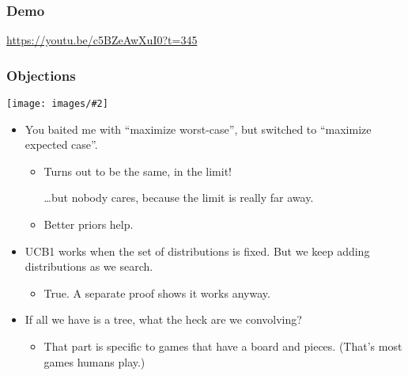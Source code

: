 \documentclass[table]{beamer}
\newcommand\img[2]{\texttt{[image: images/\#2]}}
\begin{document}
\begin{frame}
	\frametitle{Demo}
	\url{https://youtu.be/c5BZeAwXuI0?t=345}
	\addtocounter{framenumber}{-1}
\end{frame}

\begin{frame}
	\frametitle{Objections}
	\begin{center}
		\img{0.35}{trap-card.jpg}
	\end{center}

	\begin{itemize}
		\item You baited me with ``maximize worst-case'', but switched to
			``maximize expected case''.
			\begin{itemize}
				\item Turns out to be the same, in the limit!

					\ldots{}but nobody cares, because the limit is really
					far away.
				\item Better priors help.
			\end{itemize}
		\item UCB1 works when the set of distributions is fixed. But we keep
			adding distributions as we search.
			\begin{itemize}
				\item True. A separate proof shows it works anyway.
			\end{itemize}
		\item If all we have is a tree, what the heck are we convolving?
			\begin{itemize}
				\item That part is specific to games that have a board and
					pieces. (That's most games humans play.)
			\end{itemize}
	\end{itemize}
	\addtocounter{framenumber}{-1}
\end{frame}
\end{document}
